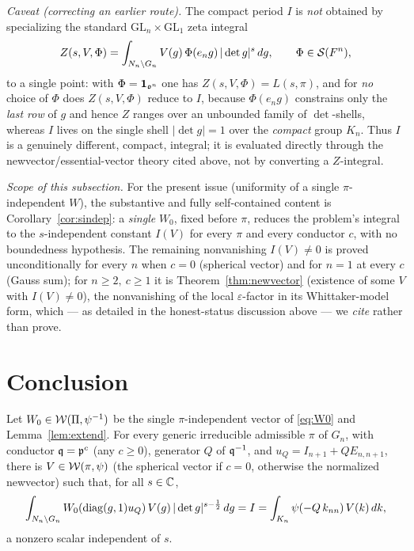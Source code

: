 \medskip
\noindent\emph{Caveat \textup{(}correcting an earlier route\textup{)}.} The compact period $I$ is
\emph{not} obtained by specializing the standard $\mathrm{GL}_n\times\mathrm{GL}_1$ zeta integral
\[
Z(s,V,\Phi)=\int_{N_n\backslash G_n}V(g)\,\Phi(e_n g)\,|\det g|^{s}\,dg ,
\qquad\Phi\in\mathcal S(F^{n}),
\]
to a single point: with $\Phi=\mathbf 1_{\mathfrak{o}^{n}}$ one has $Z(s,V,\Phi)=L(s,\pi)$, and for
\emph{no} choice of $\Phi$ does $Z(s,V,\Phi)$ reduce to $I$, because $\Phi(e_ng)$ constrains only the
\emph{last row} of $g$ and hence $Z$ ranges over an unbounded family of $\det$-shells, whereas $I$
lives on the single shell $|\det g|=1$ over the \emph{compact} group $K_n$. Thus $I$ is a genuinely
different, compact, integral; it is evaluated directly through the newvector/essential-vector theory
cited above, not by converting a $Z$-integral.

\medskip
\noindent\emph{Scope of this subsection.} For the present issue \textup{(}uniformity of a single
$\pi$-independent $W$\textup{)}, the substantive and fully self-contained content is
Corollary~\ref{cor:sindep}: a \emph{single} $W_0$, fixed before $\pi$, reduces the problem's
integral to the $s$-independent constant $I(V)$ for every $\pi$ and every conductor $c$, with no
boundedness hypothesis. The remaining nonvanishing $I(V)\neq0$ is proved unconditionally for every
$n$ when $c=0$ \textup{(}spherical vector\textup{)} and for $n=1$ at every $c$ \textup{(}Gauss
sum\textup{)}; for $n\ge2,\ c\ge1$ it is Theorem~\ref{thm:newvector} \textup{(}existence of some
$V$ with $I(V)\ne0$\textup{)}, the nonvanishing of the local $\varepsilon$-factor in its
Whittaker-model form, which --- as detailed in the honest-status discussion above --- we
\emph{cite} rather than prove.

\section*{Conclusion}

\begin{qtwoproposition}\label{prop:final}
Let $W_0\in\mathcal{W}(\Pi,\psi^{-1})$ be the single $\pi$-independent vector of \eqref{eq:W0} and
Lemma~\ref{lem:extend}. For every generic irreducible admissible $\pi$ of $G_n$, with conductor
$\mathfrak{q}=\mathfrak{p}^{c}$ \textup{(}any $c\ge0$\textup{)}, generator $Q$ of $\mathfrak{q}^{-1}$, and
$u_Q=I_{n+1}+QE_{n,n+1}$, there is $V\in\mathcal{W}(\pi,\psi)$ \textup{(}the spherical vector if $c=0$,
otherwise the normalized newvector\textup{)} such that, for all $s\in\mathbb{C}$,
\[
\int_{N_n\backslash G_n} W_0(\operatorname{diag}(g,1)u_Q)\,V(g)\,|\det g|^{s-\frac12}\,dg
= I=\int_{K_n}\psi(-Q\,k_{nn})\,V(k)\,dk,
\]
a nonzero scalar independent of $s$.
\end{qtwoproposition}

